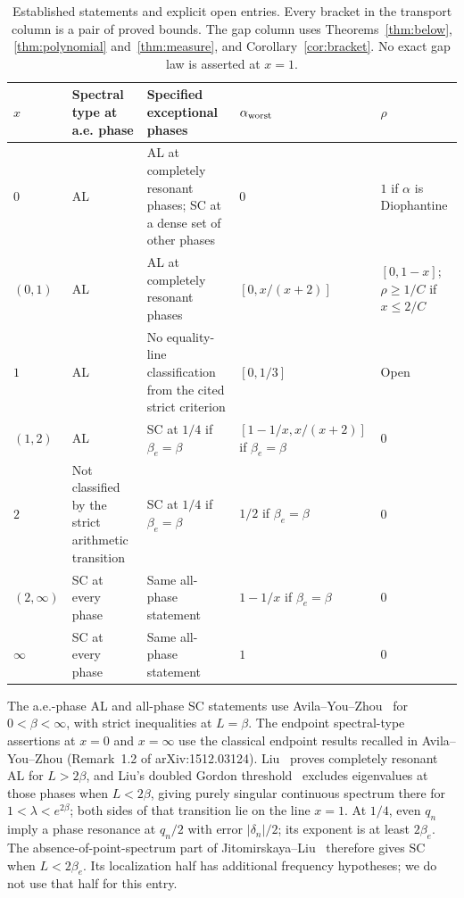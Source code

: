 \begin{table}[ht]
\centering\footnotesize
\setlength{\tabcolsep}{4pt}
\begin{tabular}{@{}>{\raggedright\arraybackslash}p{.08\linewidth}>{\raggedright\arraybackslash}p{.23\linewidth}>{\raggedright\arraybackslash}p{.26\linewidth}>{\raggedright\arraybackslash}p{.23\linewidth}>{\raggedright\arraybackslash}p{.12\linewidth}@{}}
\toprule
$x$ & Spectral type at a.e. phase & Specified exceptional phases & $\alpha_{\rm worst}$ & $\rho$\\
\midrule
$0$ & AL & AL at completely resonant phases; SC at a dense set of other phases & $0$ & $1$ if $\alpha$ is Diophantine\\[3pt]
$(0,1)$ & AL & AL at completely resonant phases & $[0,x/(x+2)]$ & $[0,1-x]$; $\rho\ge1/C$ if $x\le2/C$\\[3pt]
$1$ & AL & No equality-line classification from the cited strict criterion & $[0,1/3]$ & Open\\[3pt]
$(1,2)$ & AL & SC at $1/4$ if $\beta_e=\beta$ & $[1-1/x,x/(x+2)]$ if $\beta_e=\beta$ & $0$\\[3pt]
$2$ & Not classified by the strict arithmetic transition & SC at $1/4$ if $\beta_e=\beta$ & $1/2$ if $\beta_e=\beta$ & $0$\\[3pt]
$(2,\infty)$ & SC at every phase & Same all-phase statement & $1-1/x$ if $\beta_e=\beta$ & $0$\\[3pt]
$\infty$ & SC at every phase & Same all-phase statement & $1$ & $0$\\
\bottomrule
\end{tabular}
\caption{Established statements and explicit open entries. Every bracket in the transport column is a pair of proved bounds. The gap column uses Theorems~\ref{thm:below}, \ref{thm:polynomial} and~\ref{thm:measure}, and Corollary~\ref{cor:bracket}. No exact gap law is asserted at $x=1$.}\label{tab:phase}
\end{table}

The a.e.-phase AL and all-phase SC statements use Avila--You--Zhou~\cite[Theorem~1.1]{AYZ2017} for $0<\beta<\infty$, with strict inequalities at $L=\beta$. The endpoint spectral-type assertions at $x=0$ and $x=\infty$ use the classical endpoint results recalled in Avila--You--Zhou (Remark~1.2 of arXiv:1512.03124). Liu~\cite[Theorem~1.1]{Liu2022} proves completely resonant AL for $L>2\beta$, and Liu's doubled Gordon threshold~\cite{Liu2026} excludes eigenvalues at those phases when $L<2\beta$, giving purely singular continuous spectrum there for $1<\lambda<e^{2\beta}$; both sides of that transition lie on the line $x=1$. At $1/4$, even $q_n$ imply a phase resonance at $q_n/2$ with error $|\delta_n|/2$; its exponent is at least $2\beta_e$. The absence-of-point-spectrum part of Jitomirskaya--Liu~\cite[Theorem~4.2 and the remark after Theorem~1.1]{JLphase} therefore gives SC when $L<2\beta_e$. Its localization half has additional frequency hypotheses; we do not use that half for this entry.

